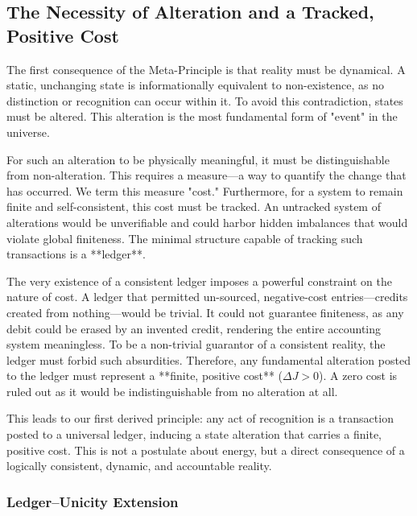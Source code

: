 \subsection{The Necessity of Alteration and a Tracked, Positive Cost}
The first consequence of the Meta-Principle is that reality must be dynamical. A static, unchanging state is informationally equivalent to non-existence, as no distinction or recognition can occur within it. To avoid this contradiction, states must be altered. This alteration is the most fundamental form of "event" in the universe.

For such an alteration to be physically meaningful, it must be distinguishable from non-alteration. This requires a measure—a way to quantify the change that has occurred. We term this measure "cost." Furthermore, for a system to remain finite and self-consistent, this cost must be tracked. An untracked system of alterations would be unverifiable and could harbor hidden imbalances that would violate global finiteness. The minimal structure capable of tracking such transactions is a **ledger**.

The very existence of a consistent ledger imposes a powerful constraint on the nature of cost. A ledger that permitted un-sourced, negative-cost entries—credits created from nothing—would be trivial. It could not guarantee finiteness, as any debit could be erased by an invented credit, rendering the entire accounting system meaningless. To be a non-trivial guarantor of a consistent reality, the ledger must forbid such absurdities. Therefore, any fundamental alteration posted to the ledger must represent a **finite, positive cost** (\(\Delta J > 0\)). A zero cost is ruled out as it would be indistinguishable from no alteration at all.

This leads to our first derived principle: any act of recognition is a transaction posted to a universal ledger, inducing a state alteration that carries a finite, positive cost. This is not a postulate about energy, but a direct consequence of a logically consistent, dynamic, and accountable reality.

\subsubsection*{Ledger–Unicity Extension}

